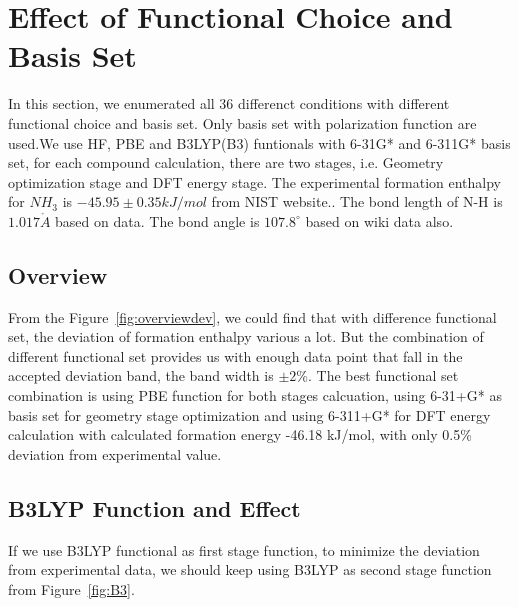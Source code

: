 \documentclass{article}
\begin{document}
\section{Effect of Functional Choice and Basis Set}

In this section, we enumerated all 36 differenct conditions with different functional choice and basis set. Only basis set with polarization function are used.We use HF, PBE and B3LYP(B3) funtionals with 6-31G* and 6-311G* basis set, for each compound calculation, there are two stages, i.e. Geometry optimization stage and DFT energy stage. The experimental formation enthalpy for $NH_{3}$ is $ -45.95 \pm0.35 kJ/mol$ from NIST website.\cite{NISTNH3}. The bond length of N-H is $1.017\mathring{A}$ based on \cite{Wiki} data. The bond angle is $107.8^{\circ}$ based on wiki \cite{Wiki} data also. 

\subsection{Overview}
From the Figure~\ref{fig:overviewdev}, we could find that with difference functional set, the deviation of formation enthalpy various a lot. But the combination of different functional set provides us with enough data point that fall in the accepted deviation band, the band width is $\pm2\%$. The best functional set combination is using PBE function for both stages calcuation, using 6-31+G* as basis set for geometry stage optimization and using 6-311+G* for DFT energy calculation with calculated formation energy -46.18 kJ/mol, with only 0.5\% deviation from experimental value. 




\subsection{B3LYP Function and Effect}
If we use B3LYP functional as first stage function, to minimize the deviation from experimental data, we should keep using B3LYP as second stage function from Figure~\ref{fig:B3}. 
\end{document}
